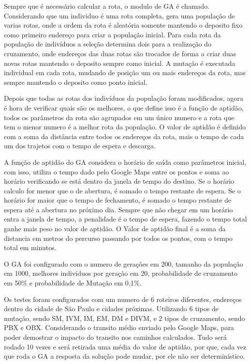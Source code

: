 Sempre que é necessário calcular a rota, o modulo de GA é chamado. Considerando que um individuo é uma rota completa, gera uma população de varias rotas, onde a ordem da rota é aleatória somente mantendo o deposito fixo como primeiro endereço para criar a população inicial.
Para cada rota da população de indivíduos a seleção determina dois para a realização do cruzamento, onde endereços das duas rotas são trocados de forma a criar duas novas rotas mantendo o deposito sempre como inicial. A mutação é executada individual em cada rota, mudando de posição um ou mais endereços da rota, mas sempre 
mantendo o deposito como ponto inicial.

Depois que todas as rotas dos indivíduos da população foram modificados, agora é hora de verificar quais são os melhores, o que define isso é a função de aptidão, todos os parâmetros da rota são agrupados em um único numero e a rota que tem o menor numero é a melhor rota da população. O valor de aptidão é definido com a soma da distância entre todos os endereços da rota, mais o tempo de cada um dos trajetos com o tempo de espera e descarga.

A função de aptidão do GA considera o horário de saída como parâmetros inicial, com isso, utiliza o tempo dado pelo Google Maps entre os pontos e soma ao horário verificando se está dentro da janela de tempo do destino. Se o horário calculo for menor que o de abertura, é somado o tempo restante de espera. Se o horário for maior que o tempo de fechamento, é somado o tempo restante de espera até a abertura no próximo dia. Sempre que não chegar em um horário entra a janela de tempo, a penalidade é o tempo de espera, fazendo o tempo total ganhe mais peso no valor de aptidão. O Valor de aptidão final é a soma da distancia em metros do percurso passando por todos os pontos, com o tempo total em minutos.

O GA foi configurado com o numero de gerações em 200, tamanho da população em 1000, melhores indivíduos por geração em 20, probabilidade de cruzamento em 50\% e probabilidade de Mutação em 0,1\%.

Os testes foram configurados com um numero de 6 roteiros diferentes, endereços dentro da cidade de São Paulo e cidades próximas. Utilizando 6 tipos de mutação, sendo SM, IVM, IM, EM, DM e DIVM, e 2 tipos de cruzamento, sendo PBX e OBX.
Considerando o transito médio enviado pelo Google Maps, para poder demostrar o impacto do transito nos caminhos calculados.
Tudo será rodado 10 vezes e será retirada uma média do valor de aptidão, por que, cada vez que roda o GA a resposta da solução pode mudar, por ele não ser determinístico.

